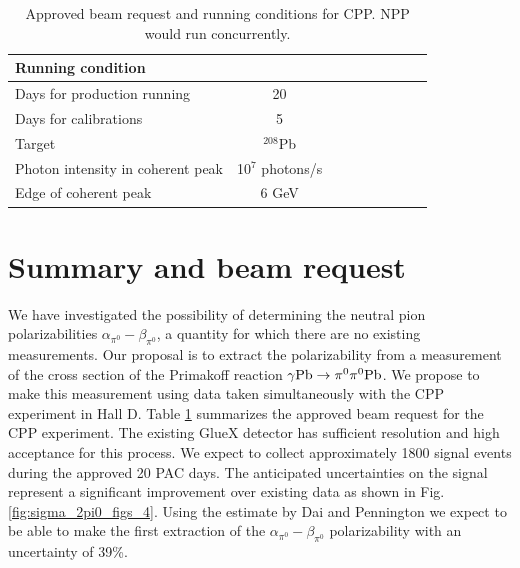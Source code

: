 \begin{table}[hbt]
\caption{Approved beam request and running conditions for CPP. NPP would run concurrently.
\label{request}
}
\begin{center}
\begin{tabular}{|l|c|c|c|c|c|c|c|c|}
\hline
\hline
  Running condition  &            \\ \hline
  Days for production running  &   20   \\ \hline
  Days for calibrations &  5       \\ \hline
  Target   & $^{208}$Pb   \\ \hline
  Photon intensity in coherent peak &   10$^7$ photons/s     \\ \hline
  Edge of coherent peak  &  6 GeV   \\ \hline
 \hline
 \hline
\end{tabular}
\end{center}
\end{table}
 
\section{Summary and beam request}
We have investigated the possibility of determining the neutral pion
polarizabilities $\alpha_{\pi^0}-\beta_{\pi^0}$, a quantity for which there are no existing measurements.
Our proposal is to extract the polarizability from a 
measurement of the cross section of the Primakoff reaction $\gamma
\rm{Pb}\rightarrow \pi^0 \pi^0 \rm{Pb}$. We propose to make this
measurement using data taken simultaneously with the CPP\cite{CPPexp}
experiment in Hall D. Table \ref{request} summarizes the approved beam request for the CPP experiment.
The existing GlueX detector has sufficient
resolution and high acceptance for this process. We expect to collect approximately 1800 signal events during the
approved 20 PAC days. The anticipated   uncertainties on
the signal represent a significant improvement over existing data as shown in Fig.\,\ref{fig:sigma_2pi0_figs_4}.
Using the estimate by Dai and Pennington \cite{Dai:2016ytz} we expect to be able to make the first extraction of the 
$\alpha_{\pi^0}-\beta_{\pi^0}$ polarizability with an uncertainty of 39\%.

